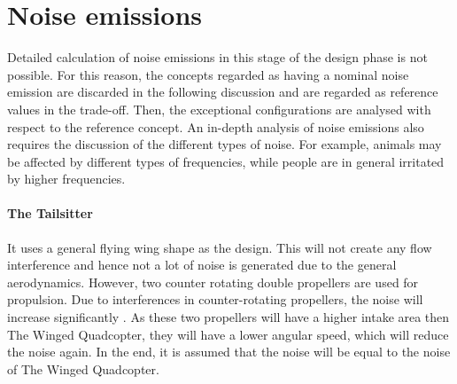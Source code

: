 \begin{table}[htb]
    \centering
    \caption{Carbon Footprint and Cumulative Energy Demand per Concept}
    \label{tab:manufac}
\end{table}


\section{Noise emissions} 

Detailed calculation of noise emissions in this stage of the design phase is not possible. For this reason, the concepts regarded as having a nominal noise emission are discarded in the following discussion and are regarded as reference values in the trade-off. Then, the exceptional configurations are analysed with respect to the reference concept. An in-depth analysis of noise emissions also requires the discussion of the different types of noise. For example, animals may be affected by different types of frequencies, while people are in general irritated by higher frequencies. 

\paragraph{The Tailsitter} It uses a general flying wing shape as the design. This will not create any flow interference and hence not a lot of noise is generated due to the general aerodynamics. However, two counter rotating double propellers are used for propulsion. Due to interferences in counter-rotating propellers, the noise will increase significantly \cite{vanderover}. As these two propellers will have a higher intake area then The Winged Quadcopter, they will have a lower angular speed, which will reduce the noise again. In the end, it is assumed that the noise will be equal to the noise of The Winged Quadcopter.  

